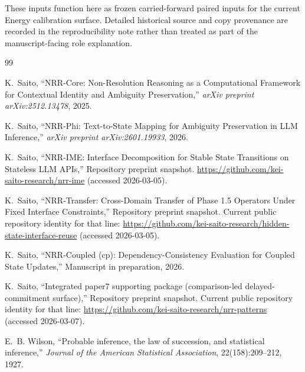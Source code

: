 \documentclass[11pt,a4paper]{article}
\begin{document}
These inputs function here as frozen carried-forward paired inputs for the current Energy calibration surface. Detailed historical source and copy provenance are recorded in the reproducibility note rather than treated as part of the manuscript-facing role explanation.

\begin{thebibliography}{99}
\raggedright

K.~Saito,
\newblock ``NRR-Core: Non-Resolution Reasoning as a Computational Framework for Contextual Identity and Ambiguity Preservation,''
\newblock \emph{arXiv preprint arXiv:2512.13478}, 2025.

K.~Saito,
\newblock ``NRR-Phi: Text-to-State Mapping for Ambiguity Preservation in LLM Inference,''
\newblock \emph{arXiv preprint arXiv:2601.19933}, 2026.

K.~Saito,
\newblock ``NRR-IME: Interface Decomposition for Stable State Transitions on Stateless LLM APIs,''
\newblock Repository preprint snapshot. \url{https://github.com/kei-saito-research/nrr-ime} (accessed 2026-03-05).

K.~Saito,
\newblock ``NRR-Transfer: Cross-Domain Transfer of Phase 1.5 Operators Under Fixed Interface Constraints,''
\newblock Repository preprint snapshot. Current public repository identity for that line: \url{https://github.com/kei-saito-research/hidden-state-interface-reuse} (accessed 2026-03-05).

K.~Saito,
\newblock ``NRR-Coupled (cp): Dependency-Consistency Evaluation for Coupled State Updates,''
\newblock Manuscript in preparation, 2026.

K.~Saito,
\newblock ``Integrated paper7 supporting package (comparison-led delayed-commitment surface),''
\newblock Repository preprint snapshot. Current public repository identity for that line: \url{https://github.com/kei-saito-research/nrr-patterns} (accessed 2026-03-07).

E.~B. Wilson,
\newblock ``Probable inference, the law of succession, and statistical inference,''
\newblock \emph{Journal of the American Statistical Association}, 22(158):209--212, 1927.

\end{thebibliography}
\end{document}
